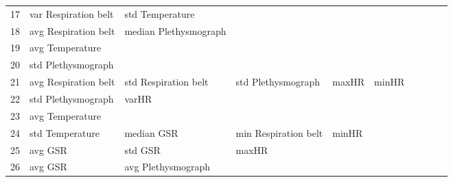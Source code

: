 \begin{landscape}
\begin{table}[]
\begin{tabular}{l|llllllll}
17       & var Respiration belt    & std Temperature       &                         &                         &                         &                       &                      &          &                      &        \\
18       & avg Respiration belt    & median Plethysmograph &                         &                         &                         &                       &                      &          &                      &        \\
19       & avg Temperature         &                       &                         &                         &                         &                       &                      &          &                      &        \\
20       & std Plethysmograph      &                       &                         &                         &                         &                       &                      &          &                      &        \\
21       & avg Respiration belt    & std Respiration belt  & std Plethysmograph      & maxHR                   & minHR                   &                       &                      &          &                      &        \\
22       & std Plethysmograph      & varHR                 &                         &                         &                         &                       &                      &          &                      &        \\
23       & avg Temperature         &                       &                         &                         &                         &                       &                      &          &                      &        \\
24       & std Temperature         & median GSR            & min Respiration belt    & minHR                   &                         &                       &                      &          &                      &        \\
25       & avg GSR                 & std GSR               & maxHR                   &                         &                         &                       &                      &          &                      &        \\
26       & avg GSR                 & avg Plethysmograph    &                         &                         &                         &                       &                      &          &                      &        \\

\end{tabular}
\end{table}
\end{landscape}
